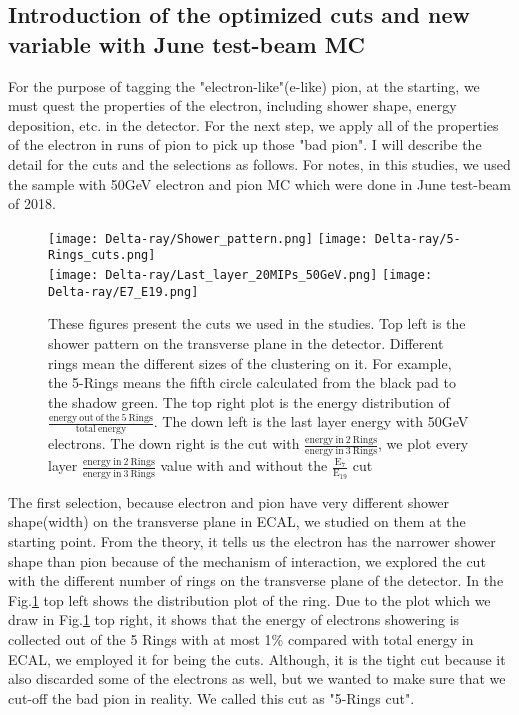 \documentclass[12pt,twoside,a4paper,an,final]{cms-tdr}
\begin{document}
\subsection{Introduction of the optimized cuts and new variable with June test-beam MC}
For the purpose of tagging the "electron-like"(e-like) pion, at the starting, we must quest the properties of the electron, including shower shape, energy deposition, etc. in the detector. For the next step, we apply all of the properties of the electron in runs of pion to pick up those "bad pion". I will describe the detail for the cuts and the selections as follows. For notes, in this studies, we used the sample with 50GeV electron and pion MC which were done in June test-beam of 2018.

\begin{figure}[!htb]
\centering
     \texttt{[image: Delta-ray/Shower\_pattern.png]}
     \texttt{[image: Delta-ray/5-Rings\_cuts.png]}\\
     \texttt{[image: Delta-ray/Last\_layer\_20MIPs\_50GeV.png]}
     \texttt{[image: Delta-ray/E7\_E19.png]}
\caption{These figures present the cuts we used in the studies. Top left is the shower pattern on the transverse plane in the detector. Different rings mean the different sizes of the clustering on it. For example, the 5-Rings means the fifth circle calculated from the black pad to the shadow green. The top right plot is the energy distribution of $\frac{\mathrm{energy \ out \ of \ the \ 5 \ Rings}}{\mathrm{total \ energy}}$. The down left is the last layer energy with 50GeV electrons. The down right is the cut with $\frac{\mathrm{energy \ in \ 2 \ Rings}}{\mathrm{energy \ in \ 3 \ Rings}}$, we plot every layer $\frac{\mathrm{energy \ in \ 2 \ Rings}}{\mathrm{energy \ in \ 3 \ Rings}}$ value with and without the $\frac{\mathrm{E_{7}}}{\mathrm{E_{19}}}$ cut}
\label{cuts_1}
\end{figure}

The first selection, because electron and pion have very different shower shape(width) on the transverse plane in ECAL, we studied on them at the starting point. From the theory, it tells us the electron has the narrower shower shape than pion because of the mechanism of interaction, we explored the cut with the different number of rings on the transverse plane of the detector. In the Fig.\ref{cuts_1} top left shows the distribution plot of the ring. Due to the plot which we draw in Fig.\ref{cuts_1} top right, it shows that the energy of electrons showering is collected out of the 5 Rings with at most 1\% compared with total energy in ECAL, we employed it for being the cuts. Although, it is the tight cut because it also discarded some of the electrons as well, but we wanted to make sure that we cut-off the bad pion in reality. We called this cut as "5-Rings cut".
\end{document}
